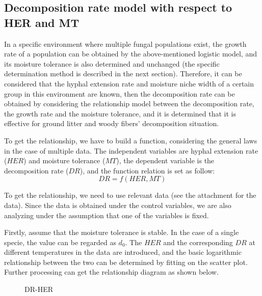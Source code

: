 \documentclass{mcmthesis}
\begin{document}
\subsection{Decomposition rate model with respect to HER and MT}
In a specific environment where multiple fungal populations exist, the growth rate of a population can be obtained by the above-mentioned logistic model, and its moisture tolerance is also determined and unchanged (the specific determination method is described in the next section). Therefore, it can be considered that the hyphal extension rate and moisture niche width of a certain group in this environment are known, then the decomposition rate can be obtained by considering the relationship model between the decomposition rate, the growth rate and the moisture tolerance, and it is determined that it is effective for ground litter and woody fibers' decomposition situation.

To get the relationship, we have to build a function, considering the general laws in the case of multiple data. The independent variables are hyphal extension rate ($HER$) and moisture tolerance ($MT$), the dependent variable is the decomposition rate ($DR$), and the function relation is set as follow:
\begin{equation} 
	DR=f(HER,MT)
\end{equation}

To get the relationship, we need to use relevant data (see the attachment for the data). Since the data is obtained under the control variables, we are also analyzing under the assumption that one of the variables is fixed.

Firstly, assume that the moisture tolerance is stable. In the case of a single specie, the value can be regarded as $d_{0}$. The $HER$ and the corresponding $DR$ at different temperatures in the data are introduced, and the basic logarithmic relationship between the two can be determined by fitting on the scatter plot. Further processing can get the relationship diagram as shown below.
\begin{figure}[h]
	\caption{DR-HER}
\end{figure}
\end{document}
